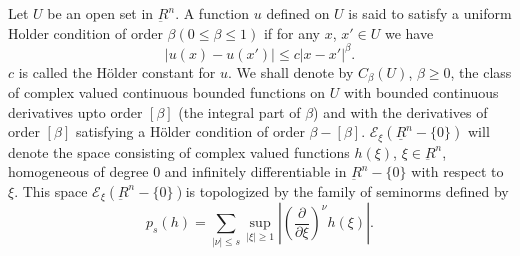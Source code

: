 Let $U$ be an open set in $\underbar{R}^n$. A function $u$ defined on
$U$ is said to satisfy a uniform Holder condition of order $ \beta (0
\leq \beta \leq 1)$ if for any $x$, $x' \in U$ we have  
\begin{equation*}
| u(x) - u (x') | \leq c |x-x' |^\beta. \tag{4.3}\label{chap4-eq4.3}
\end{equation*}
$c$ is called the H\"older constant for $u$. We shall denote by
$C_\beta (U)$, $\beta \geq 0$, the class of complex valued continuous   
bounded functions on $U$ with bounded continuous derivatives upto
order $[\beta]$ (the integral part of $\beta$) and with the
derivatives of order $[\beta]$ satisfying a H\"older condition of
order $\beta - [\beta]$. $\mathscr{E}_\xi (\underline{R}^n -\{0\})$
will denote the 
space consisting of complex valued functions $h(\xi)$, $\xi
\in \underbar{R}^n$, homogeneous of degree 0 and infinitely
differentiable in $\underbar{R}^n - \{ 0 \}$ with respect to $
\xi$. This space $ \mathscr{E}_\xi (\underbar{R}^n - \{ 0 \}
)$\pageoriginale is topologized by the family of seminorms defined by   
$$
p_s (h) = \sum\limits_{| \nu | \leq s} \sup_{| \xi | \geq 1} |
(\frac{\partial}{\partial \xi})^\nu h (\xi ) |. 
$$

